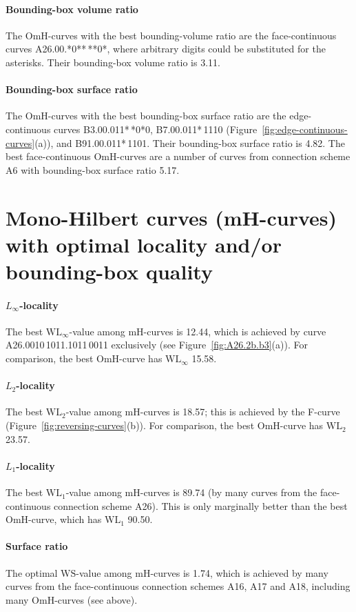 \documentclass[11pt,a4paper]{article}
\def\WLMax{\ensuremath{\mathrm{WL}_\infty}\xspace}
\def\WLEuc{\ensuremath{\mathrm{WL}_2}\xspace}
\def\WLMan{\ensuremath{\mathrm{WL}_1}\xspace}
\def\WS{\ensuremath{\mathrm{WS}}\xspace}
\begin{document}
{\paragraph{Bounding-box volume ratio}
The OmH-curves with the best bounding-volume ratio are the face-continuous curves A26.00.*0**\,**0*, where arbitrary digits could be substituted for the asterisks. Their bounding-box volume ratio is 3.11.

\paragraph{Bounding-box surface ratio}
The OmH-curves with the best bounding-box surface ratio are the edge-continuous curves B3.00.011*\,*0*0, B7.00.011*\,1110 (Figure~\ref{fig:edge-continuous-curves}(a)), and B91.00.011*\,1101. Their bounding-box surface ratio is 4.82. The best face-continuous OmH-curves are a number of curves from connection scheme A6 with bounding-box surface ratio 5.17.

\section{Mono-Hilbert curves (mH-curves) with optimal locality and/or bounding-box quality}

\paragraph{$L_\infty$-locality}
The best $\WLMax$-value among mH-curves is 12.44, which is achieved by curve A26.0010\,1011.1011\,0011 exclusively (see Figure~\ref{fig:A26.2b.b3}(a)). For comparison, the best OmH-curve has \WLMax 15.58.

\paragraph{$L_2$-locality}
The best $\WLEuc$-value among mH-curves is 18.57; this is achieved by the F-curve (Figure~\ref{fig:reversing-curves}(b)). For comparison, the best OmH-curve has \WLEuc 23.57.


\paragraph{$L_1$-locality}
The best $\WLMan$-value among mH-curves is 89.74 (by many curves from the face-continuous connection scheme A26). This is only marginally better than the best OmH-curve, which has \WLMan 90.50.


\paragraph{Surface ratio}
The optimal \WS-value among mH-curves is 1.74, which is achieved by many curves from the face-continuous connection schemes A16, A17 and A18, including many OmH-curves (see above).

}
\end{document}
